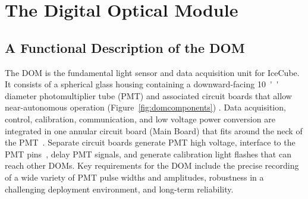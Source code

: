 
\newcommand{\degC}[1]{$\unit[#1]{^\circ{C}}$}
\def\lsim{\mathrel{\rlap{\raise 0.2ex\hbox{$\,<\,$}}{\lower 0.9ex\hbox{$\,\sim\,$}}}}
\def\gsim{\mathrel{\rlap{\raise 0.2ex\hbox{$\,>\,$}}{\lower 0.9ex\hbox{$\,\sim\,$}}}}


\section{\label{sec:dom}The Digital Optical Module}

\subsection{\label{sec:dom_functional} A Functional Description of the DOM}

The DOM is the fundamental light sensor and data acquisition unit for IceCube.
It consists of a spherical glass housing 
containing a downward-facing \SI{10}{''} diameter photomultiplier tube (PMT)
and associated circuit boards that allow near-autonomous operation (Figure~\ref{fig:domcomponents}) .
Data acquisition, control, calibration, communication, and low voltage power conversion 
are integrated in one annular circuit board (Main Board) that fits around the neck of the PMT~\cite{ref:domdaq}. 
Separate circuit boards generate PMT high voltage, interface to the PMT pins~\cite{ref:pmt},
delay PMT signals, and generate calibration light flashes that can reach other DOMs.
Key requirements for the DOM include
the precise recording of a wide variety of PMT pulse widths and amplitudes, robustness in
a challenging deployment environment, and long-term reliability.

